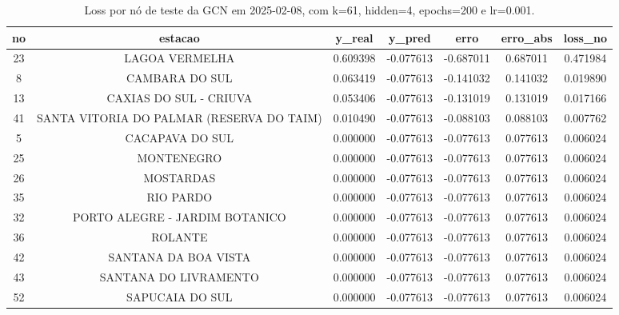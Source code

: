 \begin{table}[h]
\centering
\caption{Loss por nó de teste da GCN em 2025-02-08, com k=61, hidden=4, epochs=200 e lr=0.001.}
\label{tab:gcn_loss_nodes_k61_hidden4}
\begin{tabular}{ccccccc}
\toprule
no & estacao & y\_real & y\_pred & erro & erro\_abs & loss\_no \\
\midrule
23 & LAGOA VERMELHA & 0.609398 & -0.077613 & -0.687011 & 0.687011 & 0.471984 \\
8 & CAMBARA DO SUL & 0.063419 & -0.077613 & -0.141032 & 0.141032 & 0.019890 \\
13 & CAXIAS DO SUL - CRIUVA & 0.053406 & -0.077613 & -0.131019 & 0.131019 & 0.017166 \\
41 & SANTA VITORIA DO PALMAR (RESERVA DO TAIM) & 0.010490 & -0.077613 & -0.088103 & 0.088103 & 0.007762 \\
5 & CACAPAVA DO SUL & 0.000000 & -0.077613 & -0.077613 & 0.077613 & 0.006024 \\
25 & MONTENEGRO & 0.000000 & -0.077613 & -0.077613 & 0.077613 & 0.006024 \\
26 & MOSTARDAS & 0.000000 & -0.077613 & -0.077613 & 0.077613 & 0.006024 \\
35 & RIO PARDO & 0.000000 & -0.077613 & -0.077613 & 0.077613 & 0.006024 \\
32 & PORTO ALEGRE - JARDIM BOTANICO & 0.000000 & -0.077613 & -0.077613 & 0.077613 & 0.006024 \\
36 & ROLANTE & 0.000000 & -0.077613 & -0.077613 & 0.077613 & 0.006024 \\
42 & SANTANA DA BOA VISTA & 0.000000 & -0.077613 & -0.077613 & 0.077613 & 0.006024 \\
43 & SANTANA DO LIVRAMENTO & 0.000000 & -0.077613 & -0.077613 & 0.077613 & 0.006024 \\
52 & SAPUCAIA DO SUL & 0.000000 & -0.077613 & -0.077613 & 0.077613 & 0.006024 \\
\bottomrule
\end{tabular}
\end{table}

